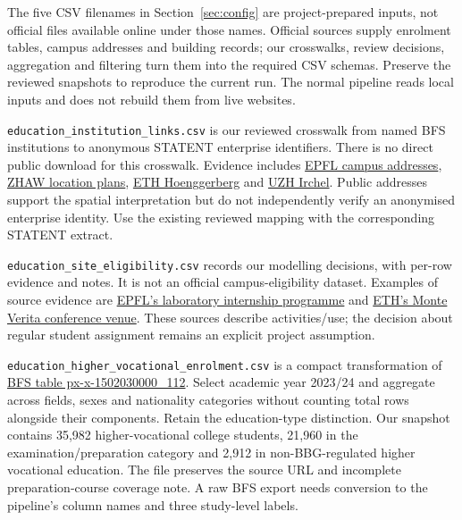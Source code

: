 \documentclass[11pt,a4paper]{article}
\newcommand{\code}[1]{\nolinkurl{#1}}
\begin{document}
The five CSV filenames in Section~\ref{sec:config} are project-prepared inputs,
not official files available online under those names. Official sources supply
enrolment tables, campus addresses and building records; our crosswalks, review
decisions, aggregation and filtering turn them into the required CSV schemas.
Preserve the reviewed snapshots to reproduce the current run. The normal pipeline
reads local inputs and does not rebuild them from live websites.

\begin{description}
\raggedright
\item[A: Institution links.] \code{education_institution_links.csv} is our
reviewed crosswalk from named BFS institutions to anonymous STATENT enterprise
identifiers. There is no direct public download for this crosswalk. Evidence
includes \href{https://www.epfl.ch/campus/visitors/coming-to-epfl/}{EPFL campus addresses},
\href{https://www.zhaw.ch/en/about-us/visitor-information/location-plans}{ZHAW location plans},
\href{https://ethz.ch/en/campus/erreichen/hoenggerberg.html}{ETH Hoenggerberg}
and \href{https://students.uzh.ch/de/dates/sites/irchel.html}{UZH Irchel}.
Public addresses support the spatial interpretation but do not independently
verify an anonymised enterprise identity. Use the existing reviewed mapping
with the corresponding STATENT extract.

\item[B: Site eligibility.] \code{education_site_eligibility.csv} records our
modelling decisions, with per-row evidence and notes. It is not an official
campus-eligibility dataset. Examples of source evidence are
\href{https://www.epfl.ch/education/bachelor/enhanced-learning-programs/summer-in-the-lab-internship-program/}{EPFL's laboratory internship programme}
and \href{https://csf.ethz.ch/monte-verita.html}{ETH's Monte Verita conference venue}.
These sources describe activities/use; the decision about regular student
assignment remains an explicit project assumption.

\item[C: Higher-vocational enrolment.]
\code{education_higher_vocational_enrolment.csv} is a compact transformation of
\href{https://www.pxweb.bfs.admin.ch/pxweb/de/px-x-1502030000_112/-/px-x-1502030000_112.px/}{BFS table px-x-1502030000\_112}.
Select academic year 2023/24 and aggregate across fields, sexes and nationality
categories without counting total rows alongside their components. Retain the
education-type distinction. Our snapshot contains 35,982 higher-vocational
college students, 21,960 in the examination/preparation category and 2,912 in
non-BBG-regulated higher vocational education. The file preserves the source
URL and incomplete preparation-course coverage note. A raw BFS export needs
conversion to the pipeline's column names and three study-level labels.


\end{description}
\end{document}
